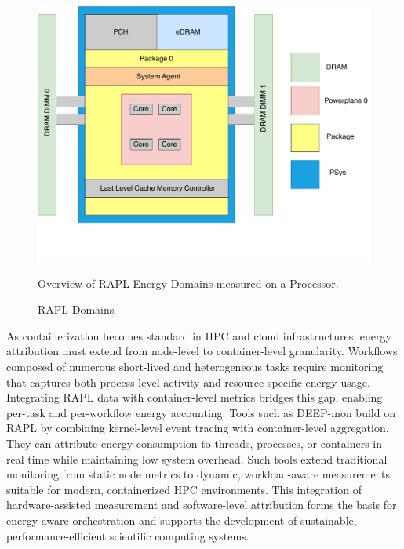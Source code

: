 \begin{figure}[H]
    \centering
    \includegraphics[scale=0.5]{fig/02/02-rapl.pdf}
    \caption{RAPL Domains}
    \label{fig:02-rapl}
    \tiny
    Overview of RAPL Energy Domains measured on a Processor.
\end{figure}

As containerization becomes standard in HPC and cloud infrastructures, energy attribution must extend from node-level to container-level granularity. Workflows composed of numerous short-lived and heterogeneous tasks require monitoring that captures both process-level activity and resource-specific energy usage. Integrating RAPL data with container-level metrics bridges this gap, enabling per-task and per-workflow energy accounting.
Tools such as DEEP-mon build on RAPL by combining kernel-level event tracing with container-level aggregation. They can attribute energy consumption to threads, processes, or containers in real time while maintaining low system overhead. Such tools extend traditional monitoring from static node metrics to dynamic, workload-aware measurements suitable for modern, containerized HPC environments. This integration of hardware-assisted measurement and software-level attribution forms the basis for energy-aware orchestration and supports the development of sustainable, performance-efficient scientific computing systems.

